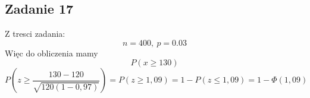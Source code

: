 \subsection{Zadanie 17}

Z tresci zadania:
$$ n=400, \: p=0.03 $$
Więc do obliczenia mamy
$$P(x \geq 130) $$
$$P(z \geq \frac {130-120}{\sqrt {120(1-0,97)}}) = P(z \geq 1,09)= 1 - P(z \leq 1,09)=1- \Phi (1,09)
$$
